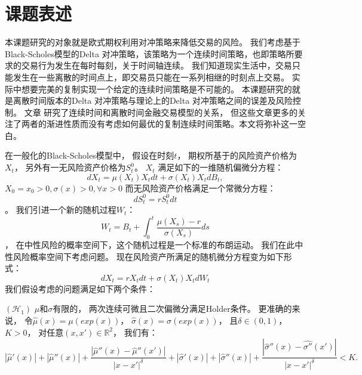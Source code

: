 
\section{课题表述} %
\label{sec:subject}

本课题研究的对象就是欧式期权利用对冲策略来降低交易的风险。
我们考虑基于Black-Scholes模型的Delta 对冲策略，该策略为一个连续时间策略，也即策略所要求的交易行为发生在每时每刻，关于时间轴连续。
我们知道现实生活中，交易只能发生在一些离散的时间点上，即交易员只能在一系列相继的时刻点上交易。
实际中想要完美的复制实现一个给定的连续时间策略是不可能的。
本课题研究的就是离散时间版本的Delta 对冲策略与理论上的Delta 对冲策略之间的误差及风险控制。
文章\cite{WhenIsTimeContinuous,DiscreteTimeHedgingErrors,Hayashi05evaluatinghedging} 研究了连续时间和离散时间金融交易模型的关系，
但这些文章更多的关注了两者的渐进性质而没有考虑如何最优的复制连续时间策略。本文将弥补这一空白。

在一般化的Black-Scholes模型中， 假设在时刻$t$， 期权所基于的风险资产价格为$X_t$， 另外有一无风险资产价格为$S_t^0$。
$X_t$ 满足如下的一维随机偏微分方程：
\begin{equation}
dX_t=\mu(X_t)X_tdt+\sigma(X_t)X_tdB_t,
\end{equation}
$X_0=x_0>0, \sigma(x)>0, \forall x>0$
而无风险资产价格满足一个常微分方程：
\begin{equation}
dS_t^0=rS^0_tdt
\end{equation}。
我们引进一个新的随机过程$W_t$：
\begin{equation}
W_t=B_t+\int^t_0\frac{\mu(X_s)-r}{\sigma(X_s)}ds
\end{equation}，
在中性风险的概率空间下，这个随机过程是一个标准的布朗运动。 我们在此中性风险概率空间下考虑问题。
现在风险资产所满足的随机微分方程变为如下形式：
\begin{equation}
dX_t=rX_tdt+\sigma(X_t)X_tdW_t
\end{equation}
我们假设考虑的问题满足如下两个条件：

$(\mathcal{H}_1)$ $\mu$和$\sigma$有限的， 两次连续可微且二次偏微分满足Holder条件。 更准确的来说， 令$\hat{\mu}(x)=\mu(exp(x))$， 
$\hat{\sigma}(x)=\sigma(exp(x))$， 且$\delta\in (0,1)$， $K>0$， 对任意$(x,x')\in \mathbb{R}^2$， 我们有：
\begin{equation}
|\hat{\mu}'(x)|+|\hat{\mu}''(x)|+\frac{|\hat{\mu}''(x)-\hat{\mu}''(x')|}{|x-x'|^\delta}+|\hat{\sigma}'(x)|+|\hat{\sigma}''(x)|+\frac{|\hat{\sigma}''(x)-\hat{\sigma''}(x')|}{|x-x'|^\delta}<K.
\end{equation}

